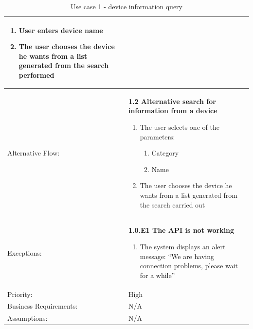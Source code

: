\begin{table}[H]
\begin{adjustbox}{width=1.2\textwidth,center=\textwidth}
\begin{tabular}{|m{4cm}|m{12cm}|}
            \begin{enumerate}
                \item User enters device name
                \item The user chooses the device he wants from a list generated from the search performed
            \end{enumerate} \\
            \hline
            Alternative Flow: & \textbf{1.2 Alternative search for information from a device}
            \begin{enumerate}
                \item The user selects one of the parameters:
                \begin{enumerate}
                    \item Category
                    \item Name
                \end{enumerate}
                \item The user chooses the device he wants from a list generated from the search carried out
            \end{enumerate} \\
            \hline
            Exceptions: & \textbf{1.0.E1  The API is not working}
            \begin{enumerate}
                \item The system displays an alert message: ``We are having connection problems, please wait for a while''
            \end{enumerate} \\
            \hline
            Priority: & High \\
            \hline
            Business Requirements: & N/A \\
            \hline
            Assumptions: & N/A \\
            \hline
        \end{tabular}
    \end{adjustbox}
    \caption{Use case 1 - device information query}
    \label{use case 1}
\end{table}

